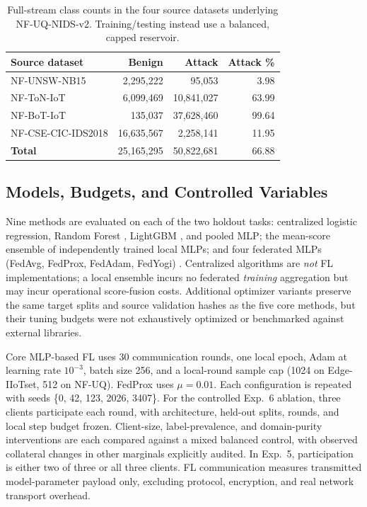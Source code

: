 \documentclass[journal,10pt]{IEEEtran}
\begin{document}
\begin{table}[t]
\centering
\caption{Full-stream class counts in the four source datasets underlying NF-UQ-NIDS-v2. Training/testing instead use a balanced, capped reservoir.}
\label{tab:source}
\scriptsize\setlength{\tabcolsep}{3pt}
\begin{tabular}{@{}lrrr@{}}
\toprule
\textbf{Source dataset} & \textbf{Benign} & \textbf{Attack} & \textbf{Attack \%}\\
\midrule
NF-UNSW-NB15 & 2,295,222 & 95,053 & 3.98\\
NF-ToN-IoT & 6,099,469 & 10,841,027 & 63.99\\
NF-BoT-IoT & 135,037 & 37,628,460 & 99.64\\
NF-CSE-CIC-IDS2018 & 16,635,567 & 2,258,141 & 11.95\\
\midrule
\textbf{Total} & 25,165,295 & 50,822,681 & 66.88\\
\bottomrule
\end{tabular}
\end{table}

\subsection{Models, Budgets, and Controlled Variables}
Nine methods are evaluated on each of the two holdout tasks: centralized logistic regression, Random Forest \cite{breiman2001}, LightGBM \cite{ke2017}, and pooled MLP; the mean-score ensemble of independently trained local MLPs; and four federated MLPs (FedAvg, FedProx, FedAdam, FedYogi) \cite{mcmahan2017,li2020,reddi2021}. Centralized algorithms are \emph{not} FL implementations; a local ensemble incurs no federated \emph{training} aggregation but may incur operational score-fusion costs. Additional optimizer variants preserve the same target splits and source validation hashes as the five core methods, but their tuning budgets were not exhaustively optimized or benchmarked against external libraries.

Core MLP-based FL uses 30 communication rounds, one local epoch, Adam at learning rate $10^{-3}$, batch size 256, and a local-round sample cap (1024 on Edge-IIoTset, 512 on NF-UQ). FedProx uses $\mu=0.01$. Each configuration is repeated with seeds \{0, 42, 123, 2026, 3407\}. For the controlled Exp.~6 ablation, three clients participate each round, with architecture, held-out splits, rounds, and local step budget frozen. Client-size, label-prevalence, and domain-purity interventions are each compared against a mixed balanced control, with observed collateral changes in other marginals explicitly audited. In Exp.~5, participation is either two of three or all three clients. FL communication measures transmitted model-parameter payload only, excluding protocol, encryption, and real network transport overhead.
\end{document}
